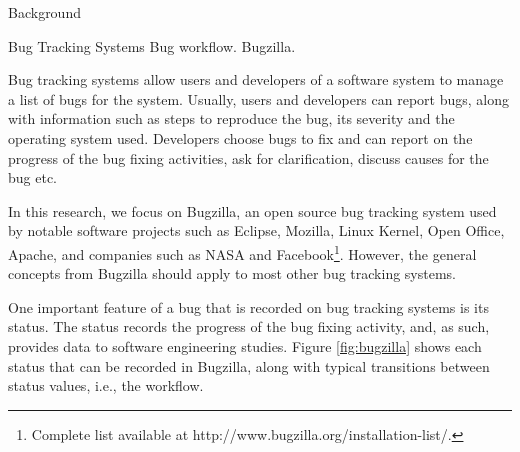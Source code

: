 \begin{section}{Background}
\end{section}

  \begin{subsection}{Bug Tracking Systems}
Bug workflow. Bugzilla. \cite{Bird2009}


Bug tracking systems allow users and developers of a software system to manage a list of bugs for the system. Usually, users and developers can report bugs, along with information such as steps to reproduce the bug, its severity and the operating system used. Developers choose bugs to fix and can report on the progress of the bug fixing activities, ask for clarification, discuss causes for the bug etc.

In this research, we focus on Bugzilla, an open source bug tracking system used by notable software projects such as Eclipse, Mozilla, Linux Kernel, Open Office, Apache, and companies such as NASA and Facebook\footnote{Complete list available at http://www.bugzilla.org/installation-list/.}. However, the general concepts from Bugzilla should apply to most other bug tracking systems.

One important feature of a bug that is recorded on bug tracking systems is its status. The status records the progress of the bug fixing activity, and, as such, provides data to software engineering studies. Figure \ref{fig:bugzilla} shows each status that can be recorded in Bugzilla, along with typical transitions between status values, i.e., the workflow.


\end{subsection}
